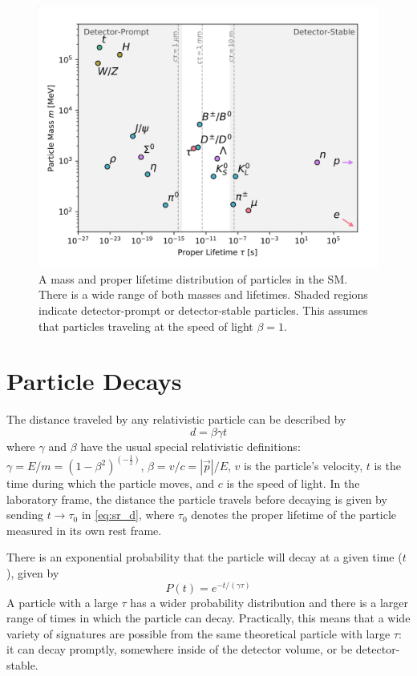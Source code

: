 \begin{figure}[!h]
\centering
\includegraphics[width=.6\textwidth]{figures/theory/LLP-mass-lifetime.png}
\caption{A mass and proper lifetime distribution of particles in the \ac{SM}. There is a wide range of both masses and lifetimes. Shaded regions indicate detector-prompt or detector-stable particles. This assumes that particles traveling at the speed of light $\beta = 1$. \cite{llp-whitepaper}}
\label{fig:llp-mass-lifetime}
\end{figure}

\section{Particle Decays}

The distance traveled by any relativistic particle can be described by
\begin{equation}
d = \beta \gamma t
\label{eq:sr_d}
\end{equation}
where $\gamma$ and $\beta$ have the usual special relativistic definitions: $\gamma = E/m = (1-\beta^2)^{(-\frac{1}{2})}$, $\beta = v/c = |\vec{p}|/E$, $v$ is the particle's velocity, $t$ is the time during which the particle moves, and $c$ is the speed of light. In the laboratory frame, the distance the particle travels before decaying is given by sending $t \rightarrow \tau_{0}$ in \autoref{eq:sr_d}, where $\tau_{0}$ denotes the proper lifetime of the particle measured in its own rest frame.

There is an exponential probability that the particle will decay at a given time ($t$), given by 
\begin{equation}
P(t) = e ^{-t/(\gamma \tau)}
\end{equation}
A particle with a large $\tau$ has a wider probability distribution and there is a larger range of times in which the particle can decay. Practically, this means that a wide variety of signatures are possible from the same theoretical particle with large $\tau$: it can decay promptly, somewhere inside of the detector volume, or be detector-stable.


